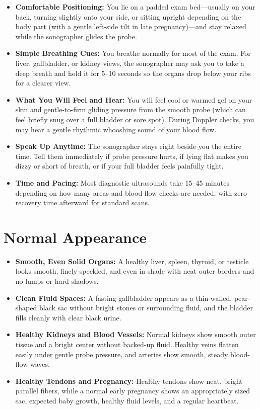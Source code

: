 \begin{itemize}
    \item \textbf{Comfortable Positioning:} You lie on a padded exam bed---usually on your back, turning slightly onto your side, or sitting upright depending on the body part (with a gentle left-side tilt in late pregnancy)---and stay relaxed while the sonographer glides the probe.
    \item \textbf{Simple Breathing Cues:} You breathe normally for most of the exam. For liver, gallbladder, or kidney views, the sonographer may ask you to take a deep breath and hold it for 5--10 seconds so the organs drop below your ribs for a clearer view.
    \item \textbf{What You Will Feel and Hear:} You will feel cool or warmed gel on your skin and gentle-to-firm gliding pressure from the smooth probe (which can feel briefly snug over a full bladder or sore spot). During Doppler checks, you may hear a gentle rhythmic whooshing sound of your blood flow.
    \item \textbf{Speak Up Anytime:} The sonographer stays right beside you the entire time. Tell them immediately if probe pressure hurts, if lying flat makes you dizzy or short of breath, or if your full bladder feels painfully tight.
    \item \textbf{Time and Pacing:} Most diagnostic ultrasounds take 15--45 minutes depending on how many areas and blood-flow checks are needed, with zero recovery time afterward for standard scans.
\end{itemize}

\section{Normal Appearance}

\begin{itemize}
    \item \textbf{Smooth, Even Solid Organs:} A healthy liver, spleen, thyroid, or testicle looks smooth, finely speckled, and even in shade with neat outer borders and no lumps or hard shadows.
    \item \textbf{Clean Fluid Spaces:} A fasting gallbladder appears as a thin-walled, pear-shaped black sac without bright stones or surrounding fluid, and the bladder fills cleanly with clear black urine.
    \item \textbf{Healthy Kidneys and Blood Vessels:} Normal kidneys show smooth outer tissue and a bright center without backed-up fluid. Healthy veins flatten easily under gentle probe pressure, and arteries show smooth, steady blood-flow waves.
    \item \textbf{Healthy Tendons and Pregnancy:} Healthy tendons show neat, bright parallel fibers, while a normal early pregnancy shows an appropriately sized sac, expected baby growth, healthy fluid levels, and a regular heartbeat.
\end{itemize}

